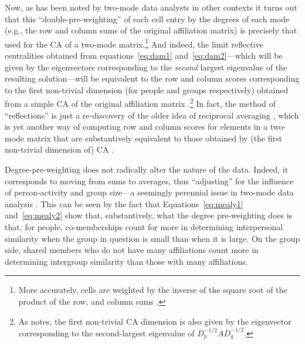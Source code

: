 \documentclass[a4paper,fleqn]{cas-sc}
\begin{document}
Now, as has been noted by two-mode data analysts in other contexts \citep[e.g.,][]{faust2005using} it turns out that this ``double-pre-weighting'' of each cell entry by the degrees of each mode (e.g., the row and column sums of the original affiliation matrix) is precisely that used for the CA of a two-mode matrix.\footnote{More accurately, cells are weighted by the inverse of the square root of the product of the row, and column sums \citep[e.g.,][124]{faust2005using}.} And indeed, the limit reflective centralities obtained from equations~\ref{eq:dam1} and~\ref{eq:dam2}---which will be given by the eigenvectors corresponding to the \textit{second} largest eigenvalue of the resulting solution---will be equivalent to the row and column scores corresponding to the first non-trivial dimension (for people and groups respectively) obtained from a simple CA of the original affiliation matrix \citep[398, eq. 9.17]{fouss2016algorithms}.\footnote{As \citet[126]{faust2005using} notes, the first non-trivial CA dimension is also given by the eigenvector corresponding to the second-largest eigenvalue of $D_p^{-1/2}AD_g^{-1/2}$.} In fact, the method of ``reflections'' is just a re-discovery of the older idea of reciprocal averaging \citep{hill1973reciprocal}, which is yet another way of computing row and column scores for elements in a two-mode matrix that are substantively equivalent to those obtained by (the first non-trivial dimension of) CA \citep{mealy2019interpreting}.

Degree-pre-weighting does not radically alter the nature of the data. Indeed, it corresponds to moving from sums to averages, thus ``adjusting'' for the influence of person-activity and group size---a seemingly perennial issue in two-mode data analysis \citep[159ff]{bonacich1991simultaneous}. This can be seen by the fact that Equations~\ref{eq:mealy1} and~\ref{eq:mealy2} show that, substantively, what the degree pre-weighting does is that, for people, co-memberships count for more in determining interpersonal similarity when the group in question is small than when it is large. On the group side, shared members who do not have many affiliations count more in determining intergroup similarity than those with many affiliations. 
\end{document}
